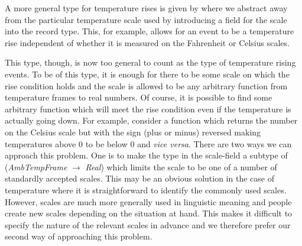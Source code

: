 A more general type for temperature rises is given by \nexteg{} where
we abstract away from the particular temperature scale used by
introducing a field for the scale into the record type.  This, for
example, allows for an event to be a temperature rise independent of
whether it is measured on the Fahrenheit or Celsius scales.  
\begin{ex} 
\label{ex:ambtempwithscale}
\end{ex} 
This type, though, is now too general to count as the type of
temperature rising events.  To be of this type, it is
enough for there to be some scale on which the rise condition holds
and the scale is allowed to be any arbitrary function from temperature
frames to real numbers.  Of course, it is possible to find some
arbitrary function which will meet the rise condition even if the
temperature is actually going down.  For example, consider a function
which returns the number on the Celsius scale but with the sign (plus
or minus)
reversed making temperatures above 0 to be below 0 and \textit{vice
  versa}. There are two ways we can approach this problem.  One is to
make the type in the scale-field a subtype of (\textit{AmbTempFrame}
$\rightarrow$ \textit{Real}) which limits the scale to be one of a
number of standardly
accepted scales.  This may be an obvious solution in the case of
temperature where it is straightforward to identify the commonly used
scales.  However, scales are much more generally used in linguistic
meaning and people create new scales depending on the situation at
hand. %
This makes it difficult to specify the
nature of the relevant scales in advance and we therefore  prefer our
second way of approaching this problem.

